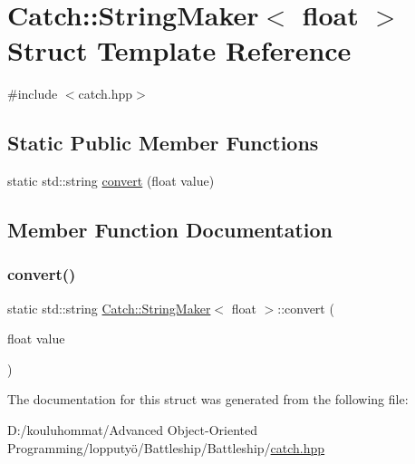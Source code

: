 \hypertarget{struct_catch_1_1_string_maker_3_01float_01_4}{}\section{Catch\+:\+:String\+Maker$<$ float $>$ Struct Template Reference}
\label{struct_catch_1_1_string_maker_3_01float_01_4}


{\ttfamily \#include $<$catch.\+hpp$>$}

\subsection*{Static Public Member Functions}
\begin{DoxyCompactItemize}
\item 
static std\+::string \mbox{\hyperlink{struct_catch_1_1_string_maker_3_01float_01_4_a7ffacc6fa46a338200f3fbb2ee078648}{convert}} (float value)
\end{DoxyCompactItemize}


\subsection{Member Function Documentation}
\mbox{\label{struct_catch_1_1_string_maker_3_01float_01_4_a7ffacc6fa46a338200f3fbb2ee078648}} 
\subsubsection{\texorpdfstring{convert()}{convert()}}
{\footnotesize\ttfamily static std\+::string \mbox{\hyperlink{struct_catch_1_1_string_maker}{Catch\+::\+String\+Maker}}$<$ float $>$\+::convert (\begin{DoxyParamCaption}\item[{float}]{value }\end{DoxyParamCaption})\hspace{0.3cm}{\ttfamily [static]}}



The documentation for this struct was generated from the following file\+:\begin{DoxyCompactItemize}
\item 
D\+:/kouluhommat/\+Advanced Object-\/\+Oriented Programming/lopputyö/\+Battleship/\+Battleship/\mbox{\hyperlink{catch_8hpp}{catch.\+hpp}}\end{DoxyCompactItemize}
